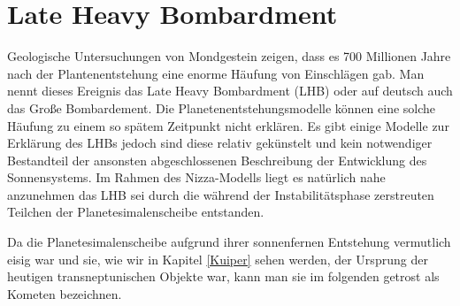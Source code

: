 \documentclass[12pt,a4paper,twoside]{article}
\begin{document}
\FloatBarrier
\section{Late Heavy Bombardment}\label{LHB}
Geologische Untersuchungen von Mondgestein zeigen, dass es 700 Millionen Jahre nach der Plantenentstehung
eine enorme Häufung von Einschlägen gab. Man nennt dieses Ereignis das Late Heavy Bombardment (LHB) oder auf deutsch auch das Große Bombardement\cite{Tera1974}.
Die Planetenentstehungsmodelle können eine solche Häufung zu einem so spätem Zeitpunkt nicht erklären.
Es gibt einige Modelle zur Erklärung des LHBs jedoch sind diese relativ gekünstelt und kein notwendiger Bestandteil der ansonsten abgeschlossenen Beschreibung der Entwicklung des Sonnensystems\cite{Gomes2005}. %
Im Rahmen des Nizza-Modells liegt es natürlich nahe anzunehmen das LHB sei durch die während der Instabilitätsphase zerstreuten Teilchen der Planetesimalenscheibe entstanden. %

Da die Planetesimalenscheibe aufgrund ihrer sonnenfernen Entstehung vermutlich eisig war und sie, wie wir in Kapitel \ref{Kuiper} sehen werden, der Ursprung der heutigen transneptunischen Objekte war, kann man sie im folgenden getrost als Kometen bezeichnen\cite{Gomes2005}. %
\end{document}
